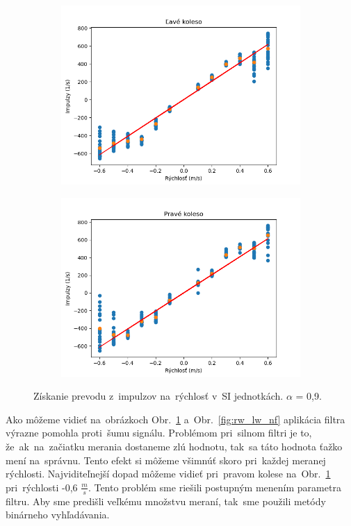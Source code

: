 \begin{figure}[!htbp]
	\begin{subfigure}{0.5\textwidth}
		\includegraphics[width=\textwidth]{img/lw_09250.png}
	\end{subfigure}
	\hfill
	\begin{subfigure}{0.5\textwidth}
		\includegraphics[width=\textwidth]{img/rw_09250.png}
	\end{subfigure}
	\caption{Získanie prevodu z~impulzov na~rýchlosť v~SI jednotkách. $\alpha$ = 0,9.}
	\label{fig:rw_lw_09250}
\end{figure}

Ako môžeme vidieť na~obrázkoch Obr.~\ref{fig:rw_lw_09250} a~Obr.~\ref{fig:rw_lw_nf} aplikácia filtra výrazne pomohla proti~šumu signálu.
Problémom pri~silnom filtri je to, že~ak~na~začiatku merania dostaneme zlú hodnotu, tak~sa táto hodnota ťažko mení na~správnu. Tento
efekt si môžeme všimnúť skoro pri~každej meranej rýchlosti. Najviditeľnejší dopad môžeme vidieť pri~pravom kolese
na~Obr.~\ref{fig:rw_lw_09250} pri~rýchlosti -0,6 $\frac{m}{s}$. Tento problém sme riešili postupným menením parametra filtru.
Aby sme predišli veľkému množstvu meraní, tak~sme použili metódy binárneho vyhľadávania.

